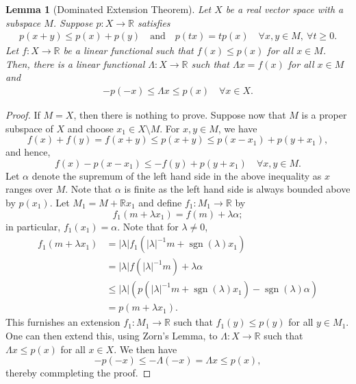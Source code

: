 \documentclass[12pt]{article}
\theoremstyle{thmstyle}
\newtheorem{lemma}[theorem]{Lemma}
\theoremstyle{defstyle}
\newcommand{\R}{\mathbb{R}}
\newcommand{\sgn}{\operatorname{sgn}}
\renewcommand{\le}{\leqslant}
\renewcommand{\ge}{\geqslant}
\begin{document}
\begin{lemma}[Dominated Extension Theorem]
    Let $X$ be a real vector space with a subspace $M$. Suppose $p: X\to\R$ satisfies
    \begin{align*}
        p(x + y)\le p(x) + p(y)\quad\text{and}\quad p(tx) = tp(x)\quad\forall x,y\in M,~\forall t\ge 0.
    \end{align*}
    Let $f: X\to\R$ be a linear functional such that $f(x)\le p(x)$ for all $x\in M$. Then, there is a linear functional $\Lambda: X\to\R$ such that $\Lambda x = f(x)$ for all $x\in M$ and 
    \begin{align*}
        -p(-x)\le \Lambda x\le p(x)\quad\forall x\in X.
    \end{align*}
\end{lemma}
\begin{proof}
    If $M = X$, then there is nothing to prove. Suppose now that $M$ is a proper subspace of $X$ and choose $x_1\in X\setminus M$. For $x,y\in M$, we have 
    \begin{equation*}
        f(x) + f(y) = f(x + y)\le p(x + y)\le p(x - x_1) + p(y + x_1),
    \end{equation*}
    and hence, 
    \begin{equation*}
        f(x) - p(x - x_1)\le -f(y) + p(y + x_1)\quad\forall x,y\in M.
    \end{equation*}
    Let $\alpha$ denote the supremum of the left hand side in the above inequality as $x$ ranges over $M$. Note that $\alpha$ is finite as the left hand side is always bounded above by $p(x_1)$. Let $M_1 = M + \R x_1$ and define $f_1: M_1\to\R$ by 
    \begin{equation*}
        f_1(m + \lambda x_1) = f(m) + \lambda\alpha;
    \end{equation*}
    in particular, $f_1(x_1) = \alpha$. Note that for $\lambda\ne 0$,
    \begin{align*}
        f_1(m + \lambda x_1) &= |\lambda| f_1(|\lambda|^{-1}m + \sgn(\lambda) x_1)\\
        &= |\lambda|f(|\lambda|^{-1}m) + \lambda\alpha\\
        &\le|\lambda|\left(p(|\lambda|^{-1}m + \sgn(\lambda) x_1) - \sgn(\lambda)\alpha\right)\\
        &= p(m + \lambda x_1).
    \end{align*}
    This furnishes an extension $f_1: M_1\to\R$ such that $f_1(y)\le p(y)$ for all $y\in M_1$. One can then extend this, using Zorn's Lemma, to $\Lambda: X\to\R$ such that $\Lambda x\le p(x)$ for all $x\in X$. We then have 
    \begin{equation*}
        -p(-x)\le -\Lambda(-x) = \Lambda x\le p(x),
    \end{equation*}
    thereby commpleting the proof.
\end{proof}
\end{document}
